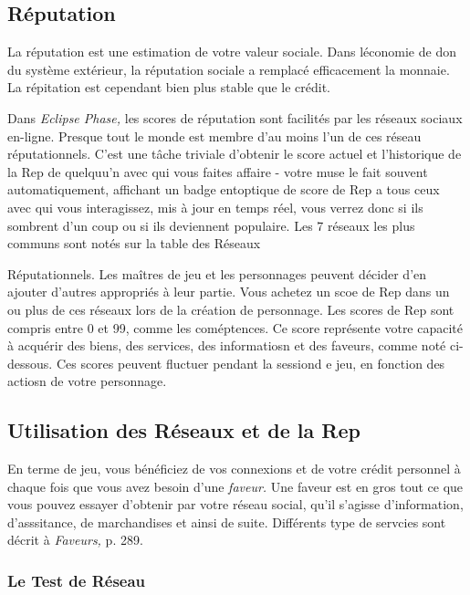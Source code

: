 \subsection{Réputation} 

La réputation est une estimation de votre valeur sociale. Dans léconomie de don du système extérieur, la réputation sociale a remplacé efficacement la monnaie. La répitation est cependant bien plus stable que le crédit. 

Dans \textit{Eclipse Phase,} les scores de réputation sont facilités par les réseaux sociaux en-ligne. Presque tout le monde est membre d'au moins l'un de ces réseau réputationnels. C'est une tâche triviale d'obtenir le score actuel et l'historique de la Rep de quelquu'n avec qui vous faites affaire - votre muse le fait souvent automatiquement, affichant un badge entoptique de score de Rep a tous ceux avec qui vous interagissez, mis à jour en temps réel, vous verrez donc si ils sombrent d'un coup ou si ils deviennent populaire. Les 7 réseaux les plus communs sont notés sur la table des Réseaux 

Réputationnels. Les maîtres de jeu et les personnages peuvent décider d'en ajouter d'autres appropriés à leur partie. Vous achetez un scoe de Rep dans un ou plus de ces réseaux lors de la création de personnage. Les scores de Rep sont compris entre 0 et 99, comme les coméptences. Ce score représente votre capacité à acquérir des biens, des services, des informatiosn et des faveurs, comme noté ci-dessous. Ces scores peuvent fluctuer pendant la sessiond e jeu, en fonction des actiosn de votre personnage. 

\subsection{Utilisation des Réseaux et de la Rep} 

En terme de jeu, vous bénéficiez de vos connexions et de votre crédit personnel à chaque fois que vous avez besoin d'une \textit{faveur.} Une faveur est en gros tout ce que vous pouvez essayer d'obtenir par votre réseau social, qu'il s'agisse d'information, d'asssitance, de marchandises et ainsi de suite. Différents type de servcies sont décrit à \textit{Faveurs,} p. 289. 

\subsubsection{Le Test de Réseau} 

